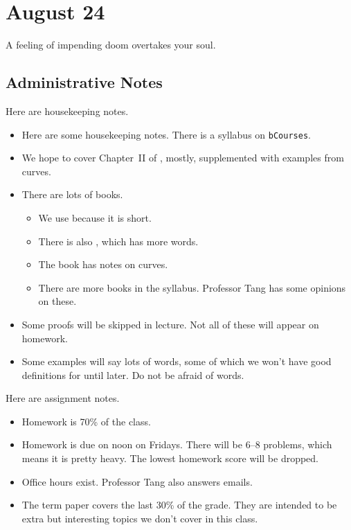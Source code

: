 \documentclass[../notes.tex]{subfiles}
\begin{document}
\section{August 24}

A feeling of impending doom overtakes your soul.

\subsection{Administrative Notes}
Here are housekeeping notes.
\begin{itemize}
	\item Here are some housekeeping notes. There is a syllabus on \texttt{bCourses}.
	\item We hope to cover Chapter~II of \cite{hartshorne}, mostly, supplemented with examples from curves.
	\item There are lots of books.
	\begin{itemize}
		\item We use \cite{hartshorne} because it is short.
		\item There is also \cite{rising-sea}, which has more words.
		\item The book \cite{liu-alg-geo-ari} has notes on curves.
		\item There are more books in the syllabus. Professor Tang has some opinions on these.
	\end{itemize}
	\item Some proofs will be skipped in lecture. Not all of these will appear on homework.
	\item Some examples will say lots of words, some of which we won't have good definitions for until later. Do not be afraid of words.
\end{itemize}
Here are assignment notes.
\begin{itemize}
	\item Homework is 70\% of the class.
	\item Homework is due on noon on Fridays. There will be 6--8 problems, which means it is pretty heavy. The lowest homework score will be dropped.
	\item Office hours exist. Professor Tang also answers emails.
	\item The term paper covers the last 30\% of the grade. They are intended to be extra but interesting topics we don't cover in this class.
\end{itemize}
\end{document}
